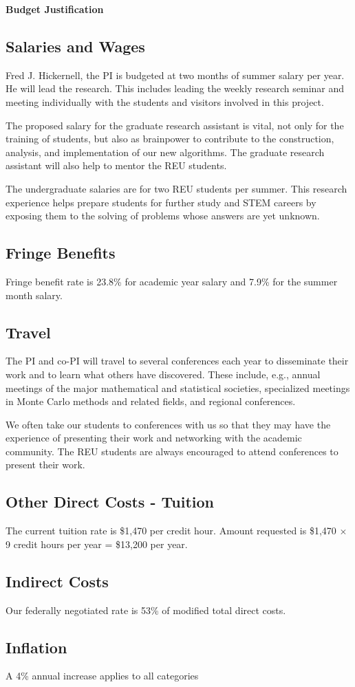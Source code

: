 \documentclass[11pt]{NSFamsart}
\begin{document}

\centerline{\textbf{\Large Budget Justification}}

\subsection*{Salaries and Wages}

Fred J. Hickernell, the PI is budgeted at two months of summer salary per year.  He will lead 
the research.  This includes leading the weekly research seminar and  meeting individually with the 
students and visitors involved in this project.

The proposed salary for the graduate research assistant is vital, not only for the training of students, 
but also as brainpower to contribute to the construction, analysis, and implementation of our new 
algorithms.  The graduate research assistant will also help to mentor the REU students.

The undergraduate salaries are for two REU students per summer.  This research experience helps 
prepare students for further study and STEM careers by exposing them to the solving of problems 
whose answers are yet unknown.

\subsection*{Fringe Benefits}
Fringe benefit rate is 23.8\% for academic year salary and 7.9\% for the summer month
salary.

\subsection*{Travel}
The PI and co-PI will travel to several conferences each year to disseminate their work and to learn 
what others have discovered.  These include, e.g., annual meetings of the major mathematical and 
statistical societies, specialized meetings in Monte Carlo methods and related fields, and regional 
conferences. 

We often take our students to conferences with us so that they may have the experience of 
presenting their work and networking with the academic community.  The REU students are always 
encouraged to attend conferences to present their work. 

\subsection*{Other Direct Costs - Tuition}
The current tuition rate is \$1,470 per credit hour. Amount requested is 
\$1,470 $\times$ 9 credit hours per year = \$13,200 per year.

\subsection*{Indirect Costs}
Our federally negotiated rate is 53\% of modified total direct costs.

\subsection*{Inflation}A 4\% annual increase applies to all categories
\end{document}
